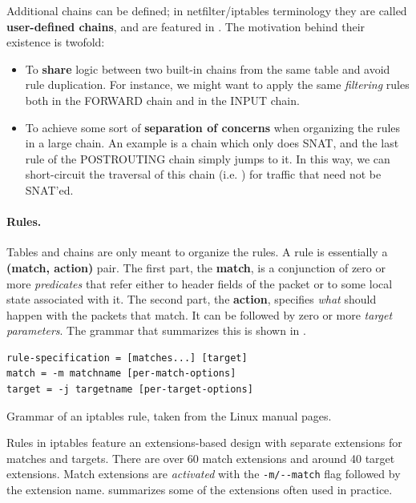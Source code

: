 Additional chains can be defined; in netfilter/iptables terminology they are
called \textbf{user-defined chains}, and are featured in
. The motivation behind their
existence is twofold:
\begin{itemize}
  \item To \textbf{share} logic between two built-in chains from the same table
    and avoid rule duplication.  For instance, we might want to apply the same
    \emph{filtering} rules both in the FORWARD chain and in the INPUT chain.
  \item To achieve some sort of \textbf{separation of concerns} when organizing
    the rules in a large chain. An example is a chain which only does SNAT, and
    the last rule of the POSTROUTING chain simply jumps to it.  In this way, we
    can short-circuit the traversal of this chain (i.e. )
    for traffic that need not be SNAT'ed.
\end{itemize}

\paragraph{Rules.}
Tables and chains are only meant to organize the rules.  A rule is essentially
a \textbf{(match, action)} pair.  The first part, the \textbf{match}, is a
conjunction of zero or more \emph{predicates} that refer either to header
fields of the packet or to some local state associated with it.  The second
part, the \textbf{action}, specifies \emph{what} should happen with the packets
that match.  It can be followed by zero or more \emph{target parameters}. The
grammar that summarizes this is shown in
.

\begin{listing}
  \lstset{numbers=none, frame=single, basicstyle=\ttfamily,
    xleftmargin=0.15\textwidth, xrightmargin=0.15\textwidth
  }
\begin{lstlisting}
rule-specification = [matches...] [target]
match = -m matchname [per-match-options]
target = -j targetname [per-target-options]
\end{lstlisting}
  \caption{Grammar of an iptables rule, taken from the Linux manual pages.}
  \label{lst:rule-grammar}
\end{listing}

Rules in iptables feature an extensions-based design with separate extensions
for matches and targets. There are over 60 match extensions and around 40
target extensions.  Match extensions are \emph{activated} with the
\lstinline{-m/--match} flag followed by the extension name.
 summarizes some of the
extensions often used in practice.


